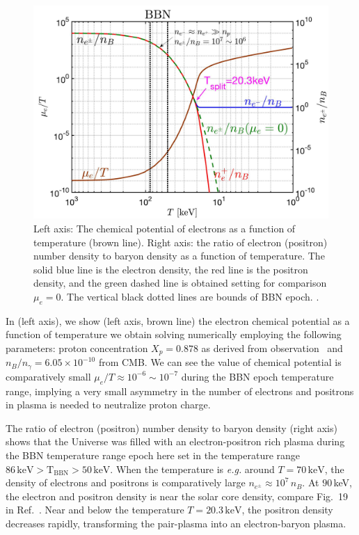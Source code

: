 \begin{figure}
\centerline{\includegraphics[width=0.90\linewidth]{plots/chap03BBN/May152023_EPDensity_Chemical}}
\caption{Left axis: The chemical potential of electrons as a function of temperature (brown line). Right axis: the ratio of electron (positron) number density to baryon density as a function of temperature. The solid blue line is the electron density, the red  line is the positron density, and the green dashed line is obtained setting for comparison $\mu_e=0$. The vertical black dotted lines are bounds of BBN epoch. . }
\label{BBN:Electron}
\end{figure}

In  (left axis), we show (left axis, brown line) the electron chemical potential as a function of temperature we obtain solving  numerically employing the following parameters: proton concentration $X_p=0.878$ as derived from observation~\cite{ParticleDataGroup:2022pth} and $n_B/n_\gamma=6.05\times10^{-10}$ from CMB. We can see the value of chemical potential is comparatively small $\mu_e/T\approx10^{-6}\sim10^{-7}$ during the BBN epoch temperature range, implying a very small asymmetry in the number of electrons and positrons in plasma is needed to neutralize proton charge. 

The ratio of electron (positron) number density to baryon density (right axis) shows that the Universe was filled with an electron-positron rich plasma during the BBN temperature range epoch here set in the temperature range $86\,\mathrm{keV}>\mathrm{T_{BBN}}>50\,\mathrm{keV}$. When the temperature is {\it e.g.\/} around $T=70\,\mathrm{keV}$, the density of electrons and positrons is comparatively large $n_{e^\pm}\approx10^7\,n_B$. At $90$\,keV, the electron and positron density is near the solar core density, compare Fig.~19 in Ref.~\cite{Rafelski:2023emw}. Near and below   the temperature  $T=20.3\,\mathrm{keV}$, the positron density decreases rapidly, transforming the pair-plasma into an electron-baryon plasma.


